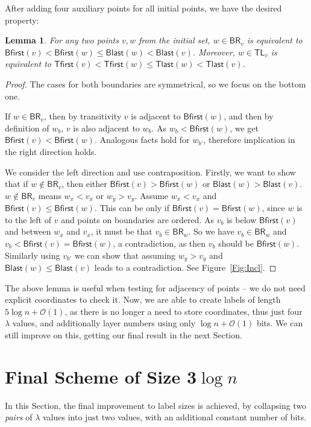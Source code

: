 \documentclass[a4paper,11pt]{article}
\newcommand{\Oh}{\mathcal{O}}
\newcommand{\lam}{\lambda}
\newcommand{\BR}{\mathsf{BR}}
\newcommand{\TL}{\mathsf{TL}}
\newcommand{\Blast}{\mathsf{Blast}}
\newcommand{\Bfirst}{\mathsf{Bfirst}}
\newcommand{\Tlast}{\mathsf{Tlast}}
\newcommand{\Tfirst}{\mathsf{Tfirst}}
\newtheorem{lemma}[theorem]{Lemma}
\begin{document}
After adding four auxiliary points for all initial points, we have the desired property:
\begin{lemma}
For any two points $v,w$ from the initial set, $w \in \BR_v$ is equivalent to $\Bfirst(v) < \Bfirst(w) \leq \Blast(w) < \Blast(v)$.
Moreover, $w \in \TL_v$ is equivalent to $\Tfirst(v) < \Tfirst(w) \leq \Tlast(w) < \Tlast(v)$.
\label{Lem:Dist1}
\end{lemma}
\begin{proof}
The cases for both boundaries are symmetrical, so we focus on the bottom one.

If $w \in \BR_v$, then by transitivity $v$ is adjacent to $\Bfirst(w)$, and then by definition of $w_b$, $v$ is also adjacent to $w_{b}$.
As $w_{b}<\Bfirst(w)$, we get $\Bfirst(v)<\Bfirst(w)$.
Analogous facts hold for $w_{b'}$, therefore implication in the right direction holds.

We consider the left direction and use contraposition.
Firstly, we want to show that if $w \notin \BR_v$, then either $\Bfirst(v)>\Bfirst(w)$ or $\Blast(w)>\Blast(v)$.
$w \notin \BR_v$ means $w_x < v_x$ or $w_y> v_y$. Assume $w_x < v_x$ and $\Bfirst(v) \leq \Bfirst(w)$.
This can be only if $\Bfirst(v) = \Bfirst(w)$, since $w$ is to the left of $v$ and points on boundaries are ordered.
As $v_{b}$ is below $\Bfirst(v)$ and between $w_x$ and $v_x$, it must be that $v_{b} \in \BR_w$.
So we have $v_{b} \in \BR_w$ and $v_{b} < \Bfirst(v)=\Bfirst(w)$, a contradiction, as then $v_{b}$ should be $\Bfirst(w)$.
Similarly using $v_{b'}$ we can show that assuming $w_y > v_y$ and $\Blast(w) \leq \Blast(v)$ leads to a contradiction.
See Figure~\ref{Fig:Incl}.
\end{proof}

The above lemma is useful when testing for adjacency of points -- we do not need explicit coordinates to check it.
Now, we are able to create labels of length $5\log{n}+\Oh(1)$,
as there is no longer a need to store coordinates, thus just four $\lam$ values,
and additionally layer numbers using only $\log{n}+\Oh(1)$ bits.
We can still improve on this, getting our final result in the next Section.



\section{Final Scheme of Size 3$\log{n}$}
\label{Sec:3log}

In this Section, the final improvement to label sizes is achieved, by collapsing two \emph{pairs} of $\lam$ values into
just two values, with an additional constant number of bits.
\end{document}
